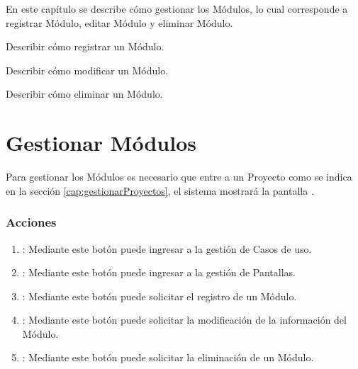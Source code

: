 
En este capítulo se describe cómo gestionar los Módulos, lo cual corresponde a registrar Módulo, editar Módulo y eliminar Módulo.\\


\begin{objetivos}
	\item Describir cómo registrar un Módulo.
	\item Describir cómo modificar un Módulo.
	\item Describir cómo eliminar un Módulo.
\end{objetivos}

\section{Gestionar Módulos}

Para gestionar los Módulos es necesario que entre a un Proyecto como se indica en la sección \ref{cap:gestionarProyectos}, el sistema mostrará la pantalla .


\subsubsection{Acciones}

\begin{enumerate}
	\item {}: Mediante este botón puede ingresar a la gestión de Casos de uso.
	\item {}: Mediante este botón puede ingresar a la gestión de Pantallas.
	\item {}: Mediante este botón puede solicitar el registro de un Módulo.
	\item {}: Mediante este botón puede solicitar la modificación de la información del Módulo.
	\item {}: Mediante este botón puede solicitar la eliminación de un Módulo.
\end{enumerate}





